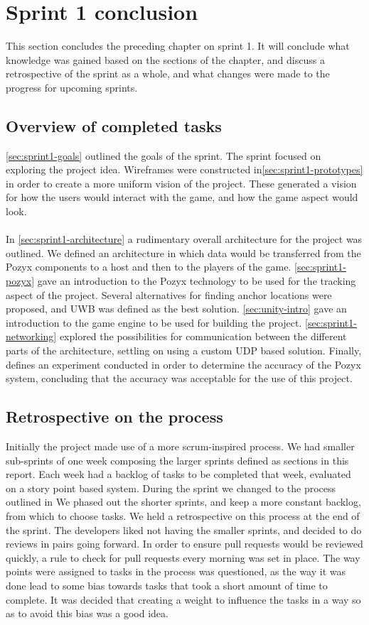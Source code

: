 \section{Sprint 1 conclusion}
This section concludes the preceding chapter on sprint 1.
It will conclude what knowledge was gained based on the sections of the chapter, and discuss a retrospective of the sprint as a whole, and what changes were made to the progress for upcoming sprints.
\subsection{Overview of completed tasks}
\autoref{sec:sprint1-goals} outlined the goals of the sprint.
The sprint focused on exploring the project idea.
Wireframes were constructed in\autoref{sec:sprint1-prototypes} in order to create a more uniform vision of the project.
These generated a vision for how the users would interact with the game, and how the game aspect would look.
\\\\
In \autoref{sec:sprint1-architecture} a rudimentary overall architecture for the project was outlined.
We defined an architecture in which data would be transferred from the Pozyx components to a host and then to the players of the game.
\autoref{sec:sprint1-pozyx} gave an introduction to the Pozyx technology to be used for the tracking aspect of the project.
Several alternatives for finding anchor locations were proposed, and UWB was defined as the best solution.
\autoref{sec:unity-intro} gave an introduction to the game engine to be used for building the project.
\autoref{sec:sprint1-networking} explored the possibilities for communication between the different parts of the architecture, settling on using a custom UDP based solution.
Finally,  defines an experiment conducted in order to determine the accuracy of the Pozyx system, concluding that the accuracy was acceptable for the use of this project.

\subsection{Retrospective on the process}
Initially the project made use of a more scrum-inspired process.
We had smaller sub-sprints of one week composing the larger sprints defined as sections in this report.
Each week had a backlog of tasks to be completed that week, evaluated on a story point based system.
During the sprint we changed to the process outlined in 
We phased out the shorter sprints, and keep a more constant backlog, from which to choose tasks.
We held a retrospective on this process at the end of the sprint.
The developers liked not having the smaller sprints, and decided to do reviews in pairs going forward.
In order to ensure pull requests would be reviewed quickly, a rule to check for pull requests every morning was set in place.
The way points were assigned to tasks in the process was questioned, as the way it was done lead to some bias towards tasks that took a short amount of time to complete.
It was decided that creating a weight to influence the tasks in a way so as to avoid this bias was a good idea.